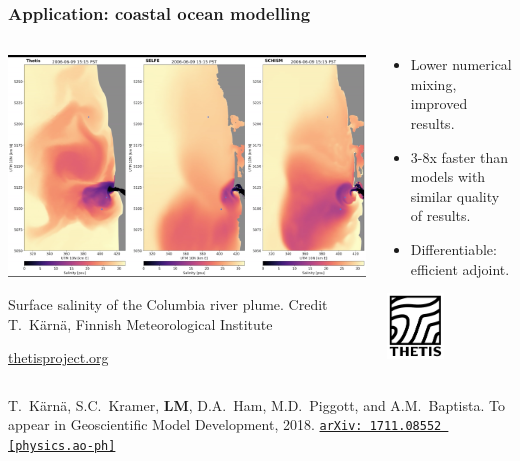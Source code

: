 \documentclass[presentation]{beamer}
\newcommand{\arxivlink}[2]{%
  \href{http://www.arxiv.org/abs/#1}%
  {\texttt{arXiv:\,#1\,[#2]}}%
}
\begin{document}
\begin{frame}
  \frametitle{Application: coastal ocean modelling}
  \begin{columns}
    \begin{column}{0.55\textwidth}
      \includegraphics[height=0.45\textheight]{thetis-snapshot}

      {\tiny Surface salinity of the Columbia river plume. Credit
        T.~K\"arn\"a, Finnish Meteorological Institute}

      \url{thetisproject.org}
    \end{column}
    \hspace{-0.04\textwidth}
    \begin{column}{0.48\textwidth}
      \begin{itemize}
      \item Lower numerical mixing, improved results.
      \item 3-8x faster than models with similar quality of results.
      \item Differentiable: efficient adjoint.
      \end{itemize}
      \hfill\includegraphics[width=1.5cm]{thetis_logo}
    \end{column}
  \end{columns}
  \begin{flushright}
    {\scriptsize T.~K\"arn\"a, S.C.~Kramer, \textbf{LM}, D.A.~Ham, M.D.~Piggott,
    and A.M.~Baptista.  To appear in Geoscientific Model Development, 2018.
    \arxivlink{1711.08552}{physics.ao-ph}\nocite{Karna:2017}}
  \end{flushright}
\end{frame}
\end{document}
